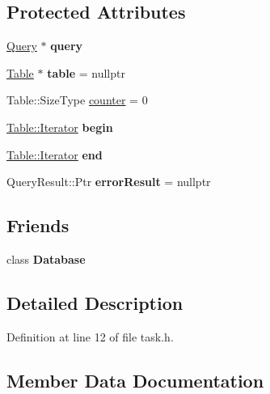 \subsection*{Protected Attributes}
\begin{DoxyCompactItemize}
\item 
\mbox{\label{class_task_aba7c96b09298eb1d88c0cfba899a5370}} 
\hyperlink{class_query}{Query} $\ast$ {\bfseries query}
\item 
\mbox{\label{class_task_a19f21bd1d9c8b2cc7e91b4cef04f0566}} 
\hyperlink{class_table}{Table} $\ast$ {\bfseries table} = nullptr
\item 
Table\+::\+Size\+Type \hyperlink{class_task_a797775a347a221efdaefe853a0977991}{counter} = 0
\item 
\mbox{\label{class_task_ad33a49bbc4669f3293aa33c96dc79be1}} 
\hyperlink{class_table_1_1_iterator_impl}{Table\+::\+Iterator} {\bfseries begin}
\item 
\mbox{\label{class_task_a65eeb1f03bdfdbc3f98c69daf652a2e0}} 
\hyperlink{class_table_1_1_iterator_impl}{Table\+::\+Iterator} {\bfseries end}
\item 
\mbox{\label{class_task_a42637d575d28f22528a8d90ed6c7bbe3}} 
Query\+Result\+::\+Ptr {\bfseries error\+Result} = nullptr
\end{DoxyCompactItemize}
\subsection*{Friends}
\begin{DoxyCompactItemize}
\item 
\mbox{\label{class_task_a6efef52d7a939622bbc934ff6b90ffe0}} 
class {\bfseries Database}
\end{DoxyCompactItemize}


\subsection{Detailed Description}


Definition at line 12 of file task.\+h.



\subsection{Member Data Documentation}
\mbox{\label{class_task_a797775a347a221efdaefe853a0977991}} 
